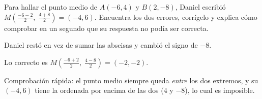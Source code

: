 \documentclass[11pt]{article}
\begin{document}
\begin{preguntas}
\pregunta[1] Para hallar el punto medio de $A(-6, 4)$ y $B(2, -8)$, Daniel escribió
$M\left(\frac{-6 - 2}{2},\; \frac{4 + 8}{2}\right) = (-4, 6)$. Encuentra los dos errores,
corrígelo y explica cómo comprobar en un segundo que su respuesta no podía ser correcta.
\begin{solucion}[4.5cm]
Daniel restó en vez de sumar las abscisas y cambió el signo de $-8$.

Lo correcto es $M\left(\frac{-6 + 2}{2},\; \frac{4 - 8}{2}\right) = (-2, -2)$.

Comprobación rápida: el punto medio siempre queda \emph{entre} los dos extremos, y su $(-4, 6)$
tiene la ordenada por encima de las dos ($4$ y $-8$), lo cual es imposible.
\end{solucion}

\end{preguntas}
\end{document}
